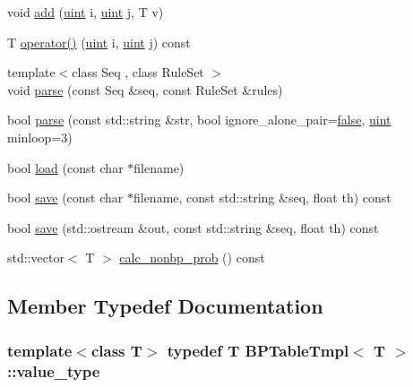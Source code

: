 \begin{DoxyCompactItemize}
void \hyperlink{class_b_p_table_tmpl_a9f52bf7c7204149e01576bbbcf7d3c0d}{add} (\hyperlink{cyktable_8h_a91ad9478d81a7aaf2593e8d9c3d06a14}{uint} i, \hyperlink{cyktable_8h_a91ad9478d81a7aaf2593e8d9c3d06a14}{uint} j, T v)
\item 
T \hyperlink{class_b_p_table_tmpl_ab0f327b7cc4bd8f2ae8f8af6d9a4cdf3}{operator()} (\hyperlink{cyktable_8h_a91ad9478d81a7aaf2593e8d9c3d06a14}{uint} i, \hyperlink{cyktable_8h_a91ad9478d81a7aaf2593e8d9c3d06a14}{uint} j) const 
\item 
{\footnotesize template$<$class Seq , class Rule\+Set $>$ }\\void \hyperlink{class_b_p_table_tmpl_af020cdf7c818a3d66e8f33e9175b6359}{parse} (const Seq \&seq, const Rule\+Set \&rules)
\item 
bool \hyperlink{class_b_p_table_tmpl_a2d953639a734fd0f58afad7ce4942e4c}{parse} (const std\+::string \&str, bool ignore\+\_\+alone\+\_\+pair=\hyperlink{naview_8c_a65e9886d74aaee76545e83dd09011727}{false}, \hyperlink{cyktable_8h_a91ad9478d81a7aaf2593e8d9c3d06a14}{uint} minloop=3)
\item 
bool \hyperlink{class_b_p_table_tmpl_a6aa3d25d6b66d1c143284951bf556706}{load} (const char $\ast$filename)
\item 
bool \hyperlink{class_b_p_table_tmpl_a5295132679f6dcf43a3a127354b27f8f}{save} (const char $\ast$filename, const std\+::string \&seq, float th) const 
\item 
bool \hyperlink{class_b_p_table_tmpl_abe59eb035cddfb500a5836c35bd0a4bb}{save} (std\+::ostream \&out, const std\+::string \&seq, float th) const 
\item 
std\+::vector$<$ T $>$ \hyperlink{class_b_p_table_tmpl_a81db1970843637bd9202fa0688c01bc7}{calc\+\_\+nonbp\+\_\+prob} () const 
\end{DoxyCompactItemize}


\subsection{Member Typedef Documentation}
\hypertarget{class_b_p_table_tmpl_abeaa8313585c7a571fae9d26211432a6}{
\subsubsection[{value\+\_\+type}]{\setlength{\rightskip}{0pt plus 5cm}template$<$class T$>$ typedef T {\bf B\+P\+Table\+Tmpl}$<$ T $>$\+::{\bf value\+\_\+type}}}\label{class_b_p_table_tmpl_abeaa8313585c7a571fae9d26211432a6}


